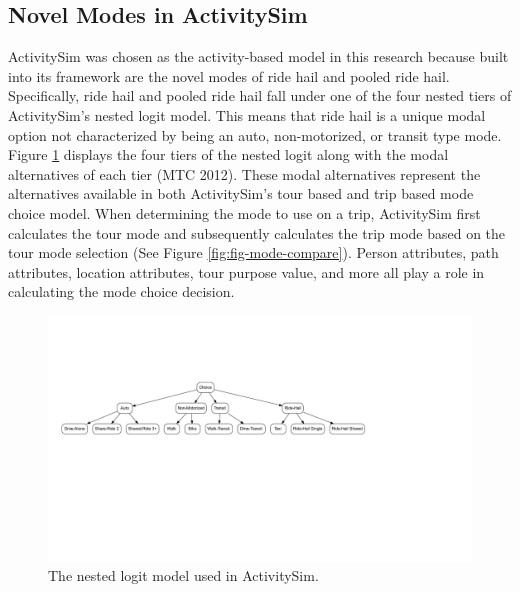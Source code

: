 \documentclass[12pt, oneside, openright]{byuthesis}
\begin{document}
\hypertarget{novel-modes-in-activitysim}{%
\subsection{Novel Modes in ActivitySim}\label{novel-modes-in-activitysim}}

ActivitySim was chosen as the activity-based model in this research because built into its framework are the novel modes of ride hail and pooled ride hail. Specifically, ride hail and pooled ride hail fall under one of the four nested tiers of ActivitySim's nested logit model. This means that ride hail is a unique modal option not characterized by being an auto, non-motorized, or transit type mode. Figure \ref{fig:fig-asim-nest} displays the four tiers of the nested logit along with the modal alternatives of each tier (MTC 2012). These modal alternatives represent the alternatives available in both ActivitySim's tour based and trip based mode choice model. When determining the mode to use on a trip, ActivitySim first calculates the tour mode and subsequently calculates the trip mode based on the tour mode selection (See Figure \ref{fig:fig-mode-compare}). Person attributes, path attributes, location attributes, tour purpose value, and more all play a role in calculating the mode choice decision.

\begin{figure}

{\centering \includegraphics[width=.7\textwidth,trim = {5cm 6.5cm 12.5cm 4cm}]{thesis_files/figure-latex/fig-asim-nest-1} 

}

\caption{The nested logit model used in ActivitySim.}\label{fig:fig-asim-nest}
\end{figure}
\end{document}
